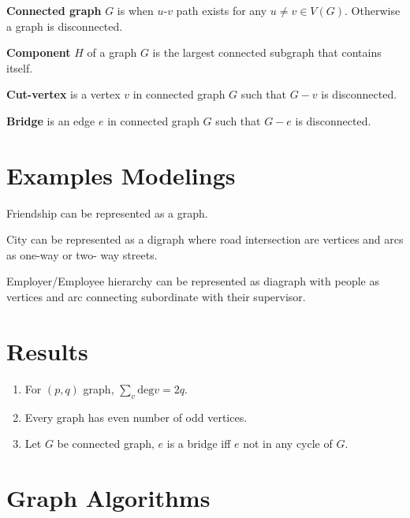 \documentclass[12pt]{article}
\begin{document}
\textbf{Connected graph} $G$ is when $u$-$v$ path exists for any $u\neq v \in V(G)$. Otherwise a graph is disconnected.

\textbf{Component} $H$ of a graph $G$ is the largest connected subgraph that contains itself. 

\textbf{Cut-vertex} is a vertex $v$ in connected graph $G$ such that $G - v$ is disconnected.

\textbf{Bridge} is an edge $e$ in connected graph $G$ such that $G - e$ is disconnected.


\section{Examples Modelings}
Friendship can be represented as a graph.

City can be represented as a digraph where road intersection are vertices and arcs as one-way or two- way streets.

Employer/Employee hierarchy can be represented as diagraph with people as vertices and arc connecting subordinate with their supervisor.  

\section{Results}
\begin{enumerate}[wide, labelwidth=!, labelindent=0pt]
	\item For $(p,q)$ graph, $\sum_v \text{deg} v = 2 q$.
	\item Every graph has even number of odd vertices.
	\item Let $G$ be connected graph, $e$ is a bridge iff $e$ not in any cycle of $G$.
\end{enumerate}

\section{Graph Algorithms}
\end{document}
